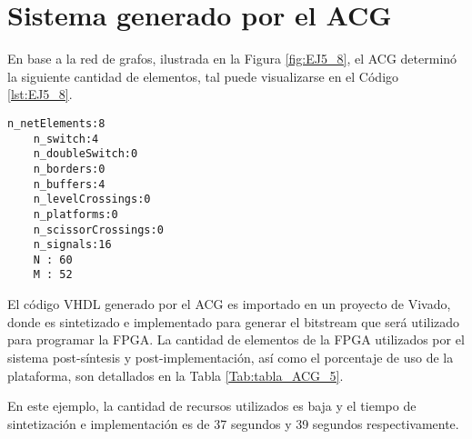 \section{Sistema generado por el ACG}

	En base a la red de grafos, ilustrada en la Figura \ref{fig:EJ5_8}, el ACG determinó la siguiente cantidad de elementos, tal puede visualizarse en el Código \ref{lst:EJ5_8}.
	
	\begin{lstlisting}[language = {}, caption = Cantidad de elementos a implementar por el ACG, label = {lst:EJ5_8}]
	n_netElements:8
	n_switch:4
	n_doubleSwitch:0
	n_borders:0
	n_buffers:4
	n_levelCrossings:0
	n_platforms:0
	n_scissorCrossings:0
	n_signals:16
	N : 60
	M : 52
	\end{lstlisting}
	
	El código VHDL generado por el ACG es importado en un proyecto de Vivado, donde es sintetizado e implementado para generar el bitstream que será utilizado para programar la FPGA. La cantidad de elementos de la FPGA utilizados por el sistema post-síntesis y post-implementación, así como el porcentaje de uso de la plataforma, son detallados en la Tabla \ref{Tab:tabla_ACG_5}.
	
	\begin{table}[H]
		{
			\caption{Síntesis e implementación del ejemplo 5 generado por el ACG.}
			\label{Tab:tabla_ACG_5}
			\centering
			\begin{center}
			\end{center}
		}    
	\end{table}
	
	En este ejemplo, la cantidad de recursos utilizados es baja y el tiempo de sintetización e implementación es de 37 segundos y 39 segundos respectivamente.